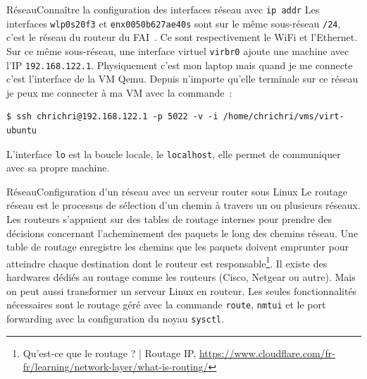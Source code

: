 \documentclass{beamer}
\begin{document}
    \begin{frame}[fragile]{Réseau}{Connaître la configuration des interfaces réseau avec \lstinline{ip addr}}
        Les interfaces \lstinline{wlp0s20f3} et \lstinline{enx0050b627ae40s} sont sur le même sous-réseau \lstinline{/24}, c'est le réseau du routeur du FAI~.
        Ce sont respectivement le WiFi et l'Ethernet.
        \bigbreak
        Sur ce même sous-réseau, une interface virtuel \lstinline{virbr0} ajoute une machine avec l'IP \lstinline{192.168.122.1}.
        Physiquement c'est mon laptop mais quand je me connecte c'est l'interface de la VM Qemu.
        Depuis n'importe qu'elle terminale sur ce réseau je peux me connecter à ma VM avec la commande~:
        \begin{lstlisting}
$ ssh chrichri@192.168.122.1 -p 5022 -v -i /home/chrichri/vms/virt-ubuntu
        \end{lstlisting}
        \bigbreak
        L'interface \lstinline{lo} est la boucle locale, le \lstinline{localhost}, elle permet de communiquer avec sa propre machine.
    \end{frame}

    \begin{frame}{Réseau}{Configuration d'un réseau avec un serveur router sous Linux}
        Le routage réseau est le processus de sélection d'un chemin à travers un ou plusieurs réseaux.
        Les routeurs s'appuient sur des tables de routage internes pour prendre des décisions concernant l'acheminement des paquets le long des chemins réseau.
        Une table de routage enregistre les chemins que les paquets doivent emprunter pour atteindre chaque destination dont le routeur est responsable\footnote{Qu'est-ce que le routage ? | Routage IP, \url{https://www.cloudflare.com/fr-fr/learning/network-layer/what-is-routing/}}.
        Il existe des hardwares dédiés au routage comme les routeurs (Cisco, Netgear ou autre).
        \bigbreak
        Mais on peut aussi transformer un serveur Linux en routeur.
        Les seules fonctionnalités nécessaires sont le routage géré avec la commande \lstinline{route}, \lstinline{nmtui} et le port forwarding avec la configuration du noyau \lstinline{sysctl}.
    \end{frame}
\end{document}
